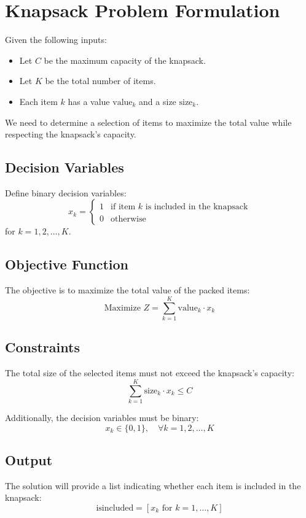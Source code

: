 \documentclass{article}
\begin{document}
\section*{Knapsack Problem Formulation}

Given the following inputs:

\begin{itemize}
    \item Let \( C \) be the maximum capacity of the knapsack.
    \item Let \( K \) be the total number of items.
    \item Each item \( k \) has a value \( \text{value}_k \) and a size \( \text{size}_k \).
\end{itemize}

We need to determine a selection of items to maximize the total value while respecting the knapsack's capacity.

\subsection*{Decision Variables}
Define binary decision variables:
\[
x_k = 
\begin{cases}
1 & \text{if item } k \text{ is included in the knapsack} \\
0 & \text{otherwise}
\end{cases}
\]
for \( k = 1, 2, \ldots, K \).

\subsection*{Objective Function}
The objective is to maximize the total value of the packed items:
\[
\text{Maximize } Z = \sum_{k=1}^{K} \text{value}_k \cdot x_k
\]

\subsection*{Constraints}
The total size of the selected items must not exceed the knapsack's capacity:
\[
\sum_{k=1}^{K} \text{size}_k \cdot x_k \leq C
\]

Additionally, the decision variables must be binary:
\[
x_k \in \{0, 1\}, \quad \forall k = 1, 2, \ldots, K
\]

\subsection*{Output}
The solution will provide a list indicating whether each item is included in the knapsack:
\[
\text{isincluded} = [x_k \text{ for } k = 1, \ldots, K]
\]
\end{document}
